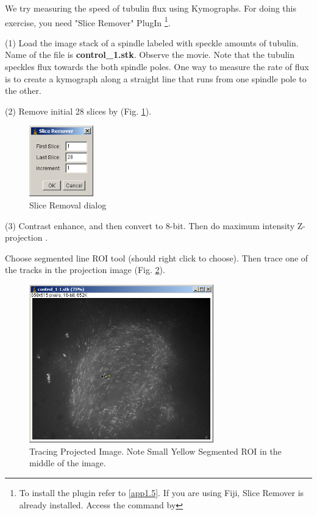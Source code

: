 \begin{indentexercise}{1}

We try measuring the speed of tubulin flux using Kymographs. 
For doing this exercise, you need "Slice Remover" PlugIn 
\footnote{ To install the plugin refer to \ref{app1.5}. If you are using Fiji,
Slice Remover is already installed. Access the command by }.

(1) Load the image stack of a spindle labeled with speckle amounts of tubulin. Name of the file is \textbf{control\_1.stk}. Observe the movie. Note that the tubulin speckles flux towards the both spindle
poles. One way to measure the rate of flux is to create a kymograph along a straight line that runs from one spindle pole to the other.

(2) Remove initial 28 slices by  (Fig. \ref{fig:img132}).

\begin{figure}[H]
\begin{center}
\includegraphics[width=2.778cm,height=3.069cm]{fig/CMCIBasicCourse201102-img132.png}
\caption{ Slice Removal dialog}
\label{fig:img132}
\end{center}
\end{figure}


(3) Contrast enhance, and then convert to 8-bit. Then do maximum intensity Z-projection . 

Choose segmented line ROI tool (should right click to choose). Then trace one of the tracks in the projection image (Fig. \ref{fig:img133}).

\begin{figure}[htbp]
\begin{center}
\includegraphics[width=8cm]{fig/CMCIBasicCourse201102-img133.png}
\caption{ Tracing Projected Image. Note Small Yellow Segmented ROI in the middle of the image.}
\label{fig:img133}
\end{center}
\end{figure}


\end{indentexercise}

